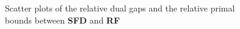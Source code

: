  \begin{figure}[htbp]
\caption{Scatter plots of the relative dual gaps and the relative primal bounds between \textbf{SFD} and \textbf{RF}}
\label{fig.scatter2}
\end{figure}

